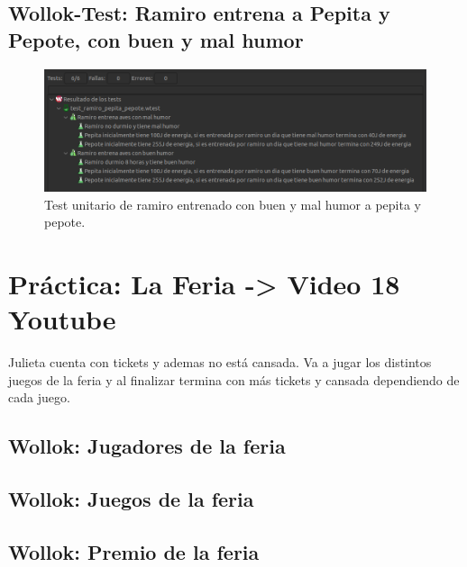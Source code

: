 \documentclass[11pt,a4paper]{article}
\begin{document}
\subsection{Wollok-Test: Ramiro entrena a Pepita y Pepote, con buen y mal humor}


\begin{figure}[H]
	\centering
	\includegraphics[scale=0.5]{figuras/test_ramiro_pepita_pepote.png}
    \caption{Test unitario de ramiro entrenado con buen y mal humor a pepita y pepote.}
    \label{fig:test ramiro entrena a pepita y pepote}
\end{figure}  

\newpage
\section{Práctica: La Feria -> Video 18 Youtube}

Julieta cuenta con tickets y ademas no está cansada. Va a jugar los distintos juegos de la feria y al finalizar termina con más tickets y cansada dependiendo de cada juego.

\subsection{Wollok: Jugadores de la feria}


\subsection{Wollok: Juegos de la feria}


\subsection{Wollok: Premio de la feria}

\end{document}
